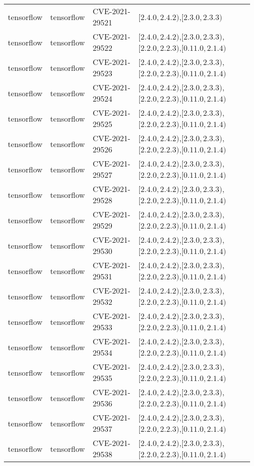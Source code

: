 \begin{tabular}{llll}
tensorflow & tensorflow & CVE-2021-29521 & $[2.4.0,2.4.2)$,$[2.3.0,2.3.3)$ \\
tensorflow & tensorflow & CVE-2021-29522 & $[2.4.0,2.4.2)$,$[2.3.0,2.3.3)$,$[2.2.0,2.2.3)$,$[0.11.0,2.1.4)$ \\
tensorflow & tensorflow & CVE-2021-29523 & $[2.4.0,2.4.2)$,$[2.3.0,2.3.3)$,$[2.2.0,2.2.3)$,$[0.11.0,2.1.4)$ \\
tensorflow & tensorflow & CVE-2021-29524 & $[2.4.0,2.4.2)$,$[2.3.0,2.3.3)$,$[2.2.0,2.2.3)$,$[0.11.0,2.1.4)$ \\
tensorflow & tensorflow & CVE-2021-29525 & $[2.4.0,2.4.2)$,$[2.3.0,2.3.3)$,$[2.2.0,2.2.3)$,$[0.11.0,2.1.4)$ \\
tensorflow & tensorflow & CVE-2021-29526 & $[2.4.0,2.4.2)$,$[2.3.0,2.3.3)$,$[2.2.0,2.2.3)$,$[0.11.0,2.1.4)$ \\
tensorflow & tensorflow & CVE-2021-29527 & $[2.4.0,2.4.2)$,$[2.3.0,2.3.3)$,$[2.2.0,2.2.3)$,$[0.11.0,2.1.4)$ \\
tensorflow & tensorflow & CVE-2021-29528 & $[2.4.0,2.4.2)$,$[2.3.0,2.3.3)$,$[2.2.0,2.2.3)$,$[0.11.0,2.1.4)$ \\
tensorflow & tensorflow & CVE-2021-29529 & $[2.4.0,2.4.2)$,$[2.3.0,2.3.3)$,$[2.2.0,2.2.3)$,$[0.11.0,2.1.4)$ \\
tensorflow & tensorflow & CVE-2021-29530 & $[2.4.0,2.4.2)$,$[2.3.0,2.3.3)$,$[2.2.0,2.2.3)$,$[0.11.0,2.1.4)$ \\
tensorflow & tensorflow & CVE-2021-29531 & $[2.4.0,2.4.2)$,$[2.3.0,2.3.3)$,$[2.2.0,2.2.3)$,$[0.11.0,2.1.4)$ \\
tensorflow & tensorflow & CVE-2021-29532 & $[2.4.0,2.4.2)$,$[2.3.0,2.3.3)$,$[2.2.0,2.2.3)$,$[0.11.0,2.1.4)$ \\
tensorflow & tensorflow & CVE-2021-29533 & $[2.4.0,2.4.2)$,$[2.3.0,2.3.3)$,$[2.2.0,2.2.3)$,$[0.11.0,2.1.4)$ \\
tensorflow & tensorflow & CVE-2021-29534 & $[2.4.0,2.4.2)$,$[2.3.0,2.3.3)$,$[2.2.0,2.2.3)$,$[0.11.0,2.1.4)$ \\
tensorflow & tensorflow & CVE-2021-29535 & $[2.4.0,2.4.2)$,$[2.3.0,2.3.3)$,$[2.2.0,2.2.3)$,$[0.11.0,2.1.4)$ \\
tensorflow & tensorflow & CVE-2021-29536 & $[2.4.0,2.4.2)$,$[2.3.0,2.3.3)$,$[2.2.0,2.2.3)$,$[0.11.0,2.1.4)$ \\
tensorflow & tensorflow & CVE-2021-29537 & $[2.4.0,2.4.2)$,$[2.3.0,2.3.3)$,$[2.2.0,2.2.3)$,$[0.11.0,2.1.4)$ \\
tensorflow & tensorflow & CVE-2021-29538 & $[2.4.0,2.4.2)$,$[2.3.0,2.3.3)$,$[2.2.0,2.2.3)$,$[0.11.0,2.1.4)$ \\

\end{tabular}
